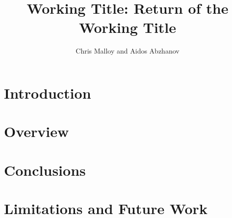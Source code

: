 \documentclass[twocolumn,11pt,notitlepage,oneside]{article}
\title{Working Title: Return of the Working Title}
\author{Chris Malloy and Aidos Abzhanov}
\date{}
\begin{document}
\maketitle

\section{Introduction}


\section{Overview}


\section{Conclusions}


\section{Limitations and Future Work}

\end{document}
